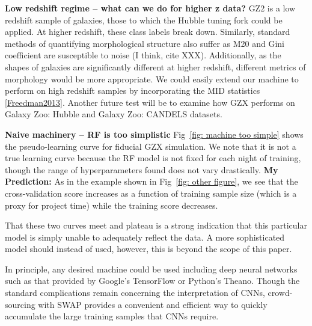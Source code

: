 \documentclass[twocolumn]{aastex6}
\begin{document}
\textbf{Low redshift regime -- what can we do for higher z data?}
GZ2 is a low redshift sample of galaxies, those to which the Hubble tuning fork 
could be applied. At higher redshift, these class labels break down. 
Similarly, standard methods of quantifying morphological structure also 
suffer as M20 and Gini coefficient are susceptible to noise (I think, cite XXX).
Additionally, as the shapes of galaxies are significantly different at higher 
redshift, different metrics of morphology would be more appropriate. 
We could easily extend our machine to perform on high redshift samples
by incorporating the MID statistics \ref{Freedman2013}. Another future
test will be to examine how GZX performs on Galaxy Zoo: Hubble and 
Galaxy Zoo: CANDELS datasets. 

\textbf{Naive machinery -- RF is too simplistic}
Fig~\ref{fig: machine too simple} shows the pseudo-learning curve for fiducial
GZX simulation. We note that it is not a true learning curve because the RF 
model is not fixed for each night of training, though the range of hyperparameters
found does not vary drastically. \textbf{My Prediction:} As in the example shown
in Fig~\ref{fig: other figure}, we see that the cross-validation score increases as a
function of training sample size (which is a proxy for project time) while the training score decreases. 

That these two curves meet and plateau is a strong indication that this particular
model is simply unable to adequately reflect the data. A more sophisticated model 
should instead of used, however, this is beyond the scope of this paper. 

In principle, any desired machine could be used including deep neural networks such 
as that provided by Google's TensorFlow or Python's Theano. Though the standard 
complications remain concerning the interpretation of CNNs, crowd-sourcing with
SWAP provides a convenient and efficient way to quickly accumulate the large training 
samples that CNNs require.  
\end{document}
